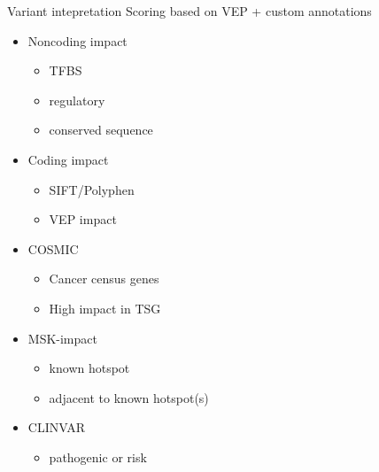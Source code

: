 \documentclass[usepdftitle=false]{beamer}
\begin{document}
\begin{frame}{Variant intepretation}
	Scoring based on VEP + custom annotations
	\begin{itemize}
		\item Noncoding impact
		\begin{itemize}
			\item TFBS
			\item regulatory
			\item conserved sequence
		\end{itemize}
		\pause
		\item Coding impact
		\begin{itemize}
			\item SIFT/Polyphen
			\item VEP impact
		\end{itemize}
		\pause
		\item COSMIC
		\begin{itemize}
			\item Cancer census genes
			\item High impact in TSG
		\end{itemize}
		\pause
		\item MSK-impact
		\begin{itemize}
			\item known hotspot
			\item adjacent to known hotspot(s)
		\end{itemize}
		\pause
		\item CLINVAR
		\begin{itemize}
			\item pathogenic or risk
		\end{itemize}
	\end{itemize}
\end{frame}
\end{document}

